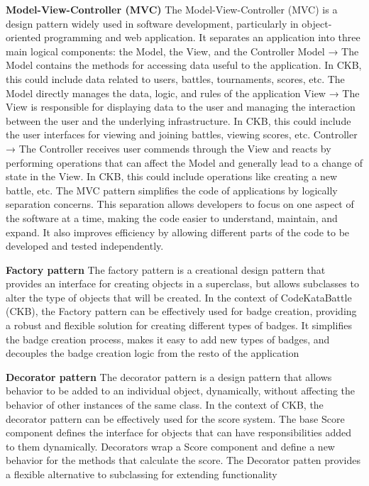 \textbf{Model-View-Controller (MVC)}\newline
The Model-View-Controller (MVC) is a design pattern widely used in software development, particularly in object-oriented programming and web application. 
It separates an application into three main logical components: the Model, the View, and the Controller\newline
Model → The Model contains the methods for accessing data useful to the application. 
In CKB, this could include data related to users, battles, tournaments, scores, etc. The Model directly manages the data, logic, and rules of the application\newline
View → The View is responsible for displaying data to the user and managing the interaction between the user and the underlying infrastructure. 
In CKB, this could include the user interfaces for viewing and joining battles, viewing scores, etc.\newline
Controller → The Controller receives user commends through the View and reacts by performing operations that can affect the Model and 
generally lead to a change of state in the View. In CKB, this could include operations like creating a new battle, etc.\newline
The MVC pattern simplifies the code of applications by logically separation concerns. 
This separation allows developers to focus on one aspect of the software at a time, making the code easier to understand, maintain, and expand. 
It also improves efficiency by allowing different parts of the code to be developed and tested independently.

\textbf{Factory pattern}\newline
The factory pattern is a creational design pattern that provides an interface for creating objects in a superclass, but allows subclasses to 
alter the type of objects that will be created. In the context of CodeKataBattle (CKB), the Factory pattern can be effectively used for badge creation, 
providing a robust and flexible solution for creating different types of badges. It simplifies the badge creation process, 
makes it easy to add new types of badges, and decouples the badge creation logic from the resto of the application

\textbf{Decorator pattern}\newline
The decorator pattern is a design pattern that allows behavior to be added to an individual object, dynamically, without affecting the behavior of other instances of the same class. 
In the context of CKB, the decorator pattern can be effectively used for the score system. 
The base Score component defines the interface for objects that can have responsibilities added to them dynamically. 
Decorators wrap a Score component and define a new behavior for the methods that calculate the score.\newline
The Decorator patten provides a flexible alternative to subclassing for extending functionality